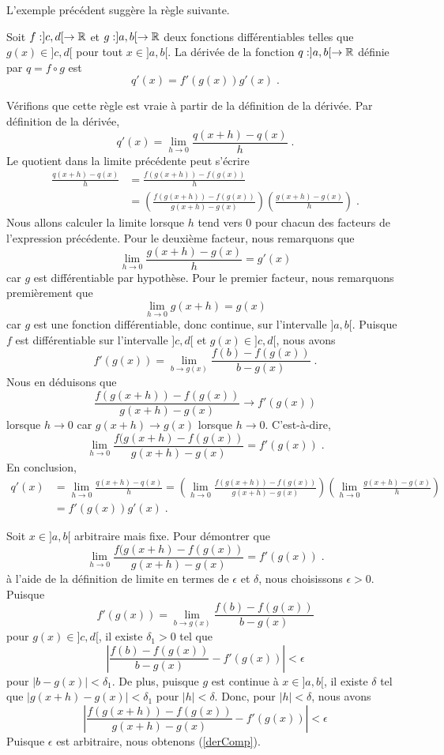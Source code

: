 {L'exemple précédent suggère la règle suivante.

\begin{focus}{\thm}
Soit $f:]c,d[\rightarrow\mathbb{R}$ et $g:]a,b[\rightarrow \mathbb{R}$ deux
fonctions différentiables telles que $g(x) \in ]c,d[$ pour tout
$x\in]a,b[$.  La dérivée de la fonction $q:]a,b[\rightarrow \mathbb{R}$
définie par $q = f \circ g$ est
\[
q'(x) = f'(g(x)) g'(x) \; .
\]
\end{focus}

Vérifions que cette règle est vraie à partir de la définition de la
dérivée.  Par définition de la dérivée,
\[
q'(x) = \lim_{h\rightarrow 0} \frac{q(x+h)-q(x)}{h} \; .
\]
Le quotient dans la limite précédente peut s'écrire
\begin{align*}
\frac{q(x+h)-q(x)}{h} &= \frac{f(g(x+h)) - f(g(x))}{h} \\
&= \left( \frac{f(g(x+h)) - f(g(x))}{g(x+h)-g(x)} \right)
\left( \frac{g(x+h)-g(x)}{h} \right) \; .
\end{align*}
Nous allons calculer la limite lorsque $h$ tend vers $0$ pour chacun
des facteurs de l'expression précédente.  Pour le deuxième facteur, nous
remarquons que
\[
\lim_{h\rightarrow 0} \frac{g(x+h)-g(x)}{h} = g'(x)
\]
car $g$ est différentiable par hypothèse.  Pour le premier facteur,
nous remarquons premièrement que
\[
\lim_{h\rightarrow 0} g(x+h) = g(x)
\]
car $g$ est une fonction différentiable, donc continue, sur
l'intervalle $]a,b[$.  Puisque $f$ est différentiable sur l'intervalle
$]c,d[$ et $g(x) \in ]c,d[$, nous avons
\[
f'(g(x))=\lim_{b\rightarrow g(x)} \frac{f(b) - f(g(x))}{b-g(x)} \; .
\]
Nous en déduisons que
\[
\frac{f(g(x+h)) - f(g(x))}{g(x+h)-g(x)} \to f'(g(x))
\]
lorsque $h \to 0$ car $g(x+h) \to g(x)$ lorsque $h \to 0$.
C'est-à-dire,
\[
\lim_{h\rightarrow 0} \frac{f(g(x +h) - f(g(x))}{g(x+h) - g(x)}
= f'(g(x)) \; .
\]
En conclusion,
\begin{align*}
q'(x) &= \lim_{h\rightarrow 0} \frac{q(x+h)-q(x)}{h}
= \left(\lim_{h\rightarrow 0} \frac{f(g(x+h)) - f(g(x))}{g(x+h)-g(x)}\right)
\left(\lim_{h\rightarrow 0} \frac{g(x+h)-g(x)}{h}\right) \\
&= f'(g(x)) g'(x) \; .
\end{align*}

\begin{rmk}[\theory]
Soit $x \in ]a,b[$ arbitraire mais fixe.  Pour démontrer que
\begin{equation}\label{derComp}
\lim_{h\rightarrow 0} \frac{f(g(x +h) - f(g(x))}{g(x+h) - g(x)}
= f'(g(x)) \; .
\end{equation}
à l'aide de la définition de limite en termes de $\epsilon$ et
$\delta$, nous choisissons $\epsilon >0$.  Puisque
\[
f'(g(x))=\lim_{b\rightarrow g(x)} \frac{f(b) - f(g(x))}{b-g(x)}
\]
pour $g(x) \in ]c,d[$, il existe $\delta_1 >0$ tel que
\[
\left| \frac{f(b) - f(g(x))}{b-g(x)} - f'(g(x))\right| < \epsilon
\]
pour $|b-g(x)| < \delta_1$.   De plus, puisque $g$ est continue
à $x \in ]a,b[$, il existe $\delta$ tel que
$|g(x+h) - g(x)| < \delta_1$ pour $|h|< \delta$.  Donc, pour
$|h|<\delta$, nous avons
\[
\left| \frac{f(g(x+h)) - f(g(x))}{g(x+h)-g(x)} - f'(g(x))\right|
< \epsilon
\]
Puisque $\epsilon$ est arbitraire, nous obtenons (\ref{derComp}).
\end{rmk}

}
